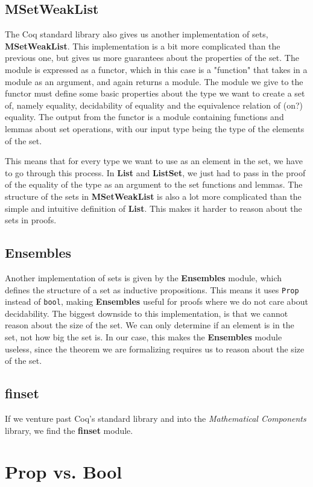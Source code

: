 \subsection{MSetWeakList}

The Coq standard library also gives us another implementation of sets, \textbf{MSetWeakList}.
This implementation is a bit more complicated than the previous one,
but gives us more guarantees about the properties of the set.
The module is expressed as a functor, which in this case is a "function" that takes in a module as an argument, and again returns a module.
The module we give to the functor must define some basic properties about the type we want to create a set of,
namely equality, decidability of equality and the equivalence relation of (on?) equality.
The output from the functor is a module containing functions and lemmas about set operations,
with our input type being the type of the elements of the set.

This means that for every type we want to use as an element in the set, we have to go through this process.
In \textbf{List} and \textbf{ListSet}, we just had to pass in the proof of the equality of the type as an argument to the set functions and lemmas.
The structure of the sets in \textbf{MSetWeakList} is also a lot more complicated than the simple and intuitive definition of \textbf{List}.
This makes it harder to reason about the sets in proofs.

\subsection{Ensembles}

Another implementation of sets is given by the \textbf{Ensembles} module, which defines the structure of a set as inductive propositions.
This means it uses \lstinline[language=Coq]{Prop} instead of \lstinline[language=Coq]{bool},
making \textbf{Ensembles} useful for proofs where we do not care about decidability.
The biggest downside to this implementation, is that we cannot reason about the size of the set.
We can only determine if an element is in the set, not how big the set is.
In our case, this makes the \textbf{Ensembles} module useless, since the theorem we are formalizing requires us to reason about the
size of the set.

\subsection{finset}

If we venture past Coq's standard library and into the \textit{Mathematical Components} library, we find the \textbf{finset} module.


\section{Prop vs. Bool}
